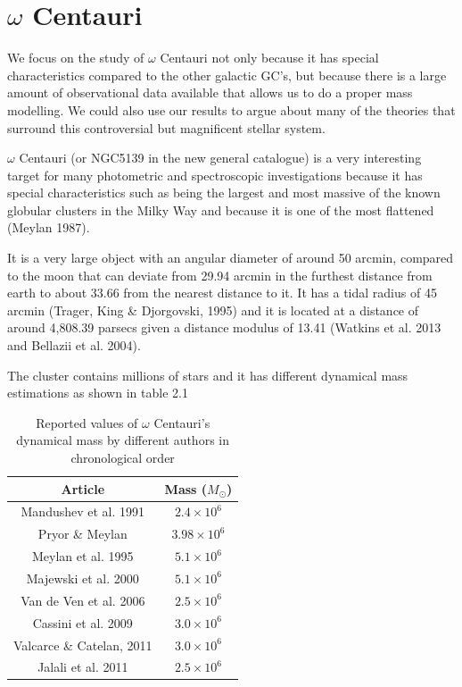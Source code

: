 \section{$\omega$ Centauri}

We focus on the study of $\omega$ Centauri not only because it has special characteristics compared to the other galactic GC's, but because there is a large amount of observational data available that allows us to do a proper mass modelling. We could also use our results to argue about many of the theories that surround this controversial but magnificent stellar system. 

$\omega$ Centauri (or NGC5139 in the new general catalogue) is a very interesting target for many photometric and spectroscopic investigations because it has special characteristics such as being the largest and most massive of the known globular clusters in the Milky Way and because it is one of the most flattened (Meylan 1987).

It is a very large object  with an angular diameter of around 50 arcmin, compared to the moon that can deviate from 29.94 arcmin in the furthest distance from earth to about 33.66 from the nearest distance to it. It has a tidal radius of 45 arcmin (Trager, King \& Djorgovski, 1995) and it is located at a distance of around 4,808.39 parsecs given a distance modulus of 13.41 (Watkins et al. 2013 and Bellazii et al. 2004).

The cluster contains millions of stars and it has different dynamical mass estimations as shown in table 2.1

\begin{table}[H]
\begin{center}
\begin{tabular}{| c | c| }
    \hline
    \textbf{Article} & \textbf{Mass} ($M_{\odot}$) \\ \hline
    Mandushev et al. 1991 & $2.4 \times 10^{6}$  \\ \hline
    Pryor \& Meylan & $3.98 \times 10^{6}$  \\ \hline
    Meylan et al. 1995 & $5.1 \times 10^{6}$  \\ \hline
    Majewski et al. 2000 & $5.1 \times 10^{6}$  \\ \hline
    Van de Ven et al. 2006 & $2.5 \times 10^{6}$  \\ \hline
    Cassini et al. 2009 & $3.0 \times 10^{6}$  \\ \hline
    Valcarce \& Catelan, 2011 & $3.0 \times 10^{6}$  \\ \hline
    Jalali et al. 2011 & $2.5 \times 10^{6}$  \\
    \hline
  \end{tabular} 
\caption[Reported mass of Omega Centauri]{Reported values of $\omega$ Centauri's dynamical mass by different authors in chronological order}
\end{center}
\end{table}

